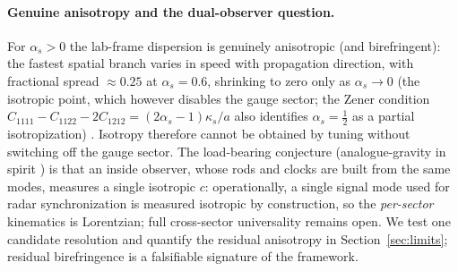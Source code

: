 \paragraph{Genuine anisotropy and the dual-observer question.} For $\alpha_s>0$ the lab-frame
dispersion is genuinely anisotropic (and birefringent): the fastest spatial branch varies in
speed with propagation direction, with fractional spread $\approx 0.25$ at $\alpha_s=0.6$,
shrinking to zero only as $\alpha_s\to 0$ (the isotropic point, which however disables the
gauge sector; the Zener condition $C_{1111}-C_{1122}-2C_{1212}=(2\alpha_s-1)\kappa_s/a$ also
identifies $\alpha_s=\tfrac12$ as a partial isotropization) \citep{repo}. Isotropy therefore
cannot be obtained by tuning without switching off the gauge sector. The load-bearing
conjecture (analogue-gravity in spirit \citep{BarceloLiberatiVisser2005}) is that an inside
observer, whose rods and clocks are built from the same modes, measures a single isotropic
$c$: operationally, a single signal mode used for radar synchronization is measured isotropic
by construction, so the \emph{per-sector} kinematics is Lorentzian; full cross-sector
universality remains open. We test one candidate resolution and quantify the residual
anisotropy in Section~\ref{sec:limits}; residual birefringence is a falsifiable signature of
the framework.

